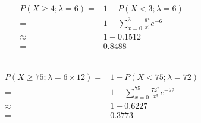 \documentclass{article}
\begin{document}
        \subsection{}
            \paragraph{
                \begin{equation*}
                    \begin{split}
                        P(X\geq 4;\lambda=6)=&1-P(X<3;\lambda=6)\\
                            =&1-\sum_{x=0}^3\frac{6^x}{x!}e^{-6}\\
                            \approx&1-0.1512\\
                            =&0.8488\\
                    \end{split}
                \end{equation*}
            }
        \subsection{}
            \paragraph{
                \begin{equation*}
                    \begin{split}
                        P(X\geq 75;\lambda=6\times12)=&1-P(X<75;\lambda=72)\\
                            =&1-\sum_{x=0}^{75} \frac{72^x}{x!}e^{-72}\\
                            \approx&1-0.6227\\
                            =&0.3773\\
                    \end{split}
                \end{equation*}
            }
    \section{}
        \subsection{}
\end{document}
